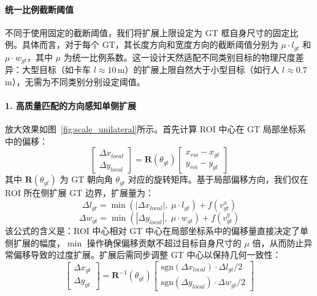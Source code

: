 \documentclass[12pt, UTF8]{ctexart}
\begin{document}
\paragraph{统一比例截断阈值}
不同于使用固定的截断阈值，我们将扩展上限设定为 GT 框自身尺寸的固定比例。具体而言，对于每个 GT，其长度方向和宽度方向的截断阈值分别为 $\mu \cdot l_{gt}$ 和 $\mu \cdot w_{gt}$，其中 $\mu$ 为统一比例系数。这一设计天然适配不同类别目标的物理尺度差异：大型目标（如卡车 $l \approx 10$\,m）的扩展上限自然大于小型目标（如行人 $l \approx 0.7$\,m），无需为不同类别分别设定阈值。

\paragraph{1. 高质量匹配的方向感知单侧扩展}
放大效果如图~\ref{fig:scale_unilateral}所示。首先计算 ROI 中心在 GT 局部坐标系中的偏移：
\begin{equation}
\begin{bmatrix} \Delta x_{local} \\ \Delta y_{local} \end{bmatrix} = \mathbf{R}(\theta_{gt}) \begin{bmatrix} x_{roi} - x_{gt} \\ y_{roi} - y_{gt} \end{bmatrix}
\end{equation}
其中 $\mathbf{R}(\theta_{gt})$ 为 GT 朝向角 $\theta_{gt}$ 对应的旋转矩阵。基于局部偏移方向，我们仅在 ROI 所在侧扩展 GT 边界，扩展量为：
\begin{equation}
\Delta l_{gt} = \min(|\Delta x_{local}|,\; \mu \cdot l_{gt}) + f(v_{gt}^x)
\end{equation}
\begin{equation}
\Delta w_{gt} = \min(|\Delta y_{local}|,\; \mu \cdot w_{gt}) + f(v_{gt}^y)
\end{equation}
该公式的含义是：ROI 中心相对 GT 中心在局部坐标系中的偏移量直接决定了单侧扩展的幅度，$\min$ 操作确保偏移贡献不超过目标自身尺寸的 $\mu$ 倍，从而防止异常偏移导致的过度扩展。扩展后需同步调整 GT 中心以保持几何一致性：
\begin{equation}
\begin{bmatrix} \Delta x_{gt} \\ \Delta y_{gt} \end{bmatrix} = \mathbf{R}^{-1}(\theta_{gt}) \begin{bmatrix} \text{sgn}(\Delta x_{local}) \cdot \Delta l_{gt} / 2 \\ \text{sgn}(\Delta y_{local}) \cdot \Delta w_{gt} / 2 \end{bmatrix}
\end{equation}
\end{document}

